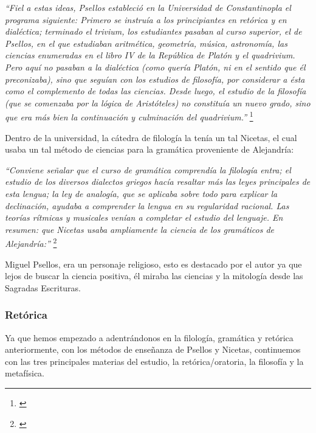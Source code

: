 \textit{“Fiel a estas ideas, Psellos estableció en la Universidad de 
Constantinopla el programa siguiente: Primero se instruía a los 
principiantes en retórica y en dialéctica; terminado el trivium, 
los estudiantes pasaban al curso superior, el de Psellos, en el que 
estudiaban aritmética, geometría, música, astronomía, las ciencias 
enumeradas en el libro IV de la República de Platón y el quadrivium. 
Pero aquí no pasaban a la dialéctica (como quería Platón, ni en el 
sentido que él preconizaba), sino que seguían con los estudios de 
filosofía, por considerar a ésta como el complemento de todas las 
ciencias. Desde luego, el estudio de la filosofía 
(que se comenzaba por la lógica de Aristóteles) no constituía un 
nuevo grado, sino que era más bien la continuación y culminación 
del quadrivium.”}
\footnote{\cite[pp.~161--162]{filosofia}}

Dentro de la universidad, la cátedra de filología la tenía un tal 
Nicetas, el cual usaba un tal método de ciencias para la 
gramática proveniente de Alejandría:

\textit{“Conviene señalar que el curso de gramática comprendía la 
filología entra; el estudio de los diversos dialectos griegos 
hacía resaltar más las leyes principales de esta lengua; la 
ley de analogía, que se aplicaba sobre todo para explicar la 
declinación, ayudaba a comprender la lengua en su regularidad 
racional. Las teorías rítmicas y musicales venían a completar el 
estudio del lenguaje. En resumen: que Nicetas usaba ampliamente la 
ciencia de los gramáticos de Alejandría:”}
\footnote{\cite[p.~162]{filosofia}}


Miguel Psellos, era un personaje religioso,
esto es destacado por el autor ya que lejos de buscar la ciencia
positiva, él miraba las ciencias y la mitología desde las
Sagradas Escrituras.

\subsubsection{Retórica}
Ya que hemos empezado a adentrándonos en la filología, gramática y 
retórica anteriormente, con los métodos de enseñanza de Psellos y 
Nicetas, continuemos con las tres principales materias del estudio, 
la retórica/oratoria, la filosofía y la metafísica.

